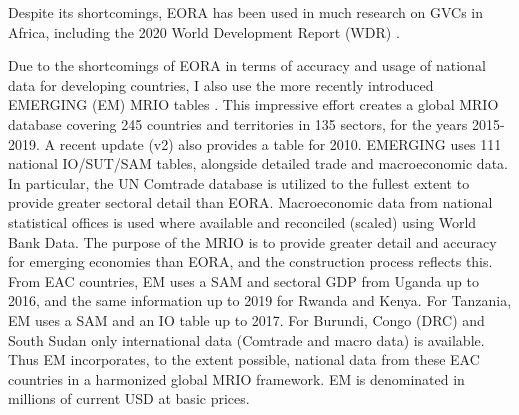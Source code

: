 \documentclass[a4paper]{article}
\begin{document}
Despite its shortcomings, EORA has been used in much research on GVCs in Africa, including the 2020 World Development Report (WDR) \citep{world2020trading}.\newline 

Due to the shortcomings of EORA in terms of accuracy and usage of national data for developing countries, I also use the more recently introduced EMERGING (EM) MRIO tables \citep{huo2022full}. This impressive effort creates a global MRIO database covering 245 countries and territories in 135 sectors, for the years 2015-2019. A recent update (v2) also provides a table for 2010. EMERGING uses 111 national IO/SUT/SAM tables, alongside detailed trade and macroeconomic data. In particular, the UN Comtrade database is utilized to the fullest extent to provide greater sectoral detail than EORA. Macroeconomic data from national statistical offices is used where available and reconciled (scaled) using World Bank Data. The purpose of the MRIO is to provide greater detail and accuracy for emerging economies than EORA, and the construction process reflects this. From EAC countries, EM uses a SAM and sectoral GDP from Uganda up to 2016, and the same information up to 2019 for Rwanda and Kenya. For Tanzania, EM uses a SAM and an IO table up to 2017. For Burundi, Congo (DRC) and South Sudan only international data (Comtrade and macro data) is available. Thus EM incorporates, to the extent possible, national data from these EAC countries in a harmonized global MRIO framework. EM is denominated in millions of current USD at basic prices. \newline
\end{document}
